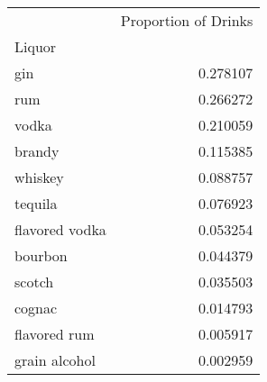 \documentclass[preview]{standalone}
\begin{document}
    \begin{tabular}{lr}
\toprule
{} &  Proportion of Drinks \\
Liquor         &                       \\
\midrule
gin            &              0.278107 \\
rum            &              0.266272 \\
vodka          &              0.210059 \\
brandy         &              0.115385 \\
whiskey        &              0.088757 \\
tequila        &              0.076923 \\
flavored vodka &              0.053254 \\
bourbon        &              0.044379 \\
scotch         &              0.035503 \\
cognac         &              0.014793 \\
flavored rum   &              0.005917 \\
grain alcohol  &              0.002959 \\
\bottomrule
\end{tabular}

    
\end{document}

